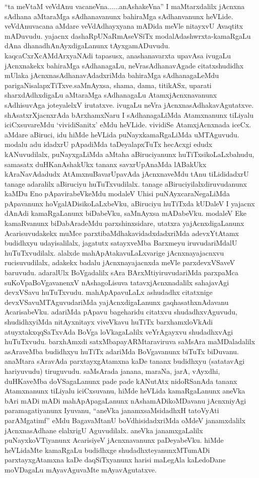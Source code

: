 \begin{artha}
``ta meVtaM veVdAnu vacaneVna......anAshakeVna'' I maMtarxdalilx jAcnxna sAdhana aMtaraMga sAdhanavanunx bahiraMga sAdhanvanunx heVLide. veVdAnuvacana aMdare veVdAdhayxyana mADida meVle nitayxvU Avaqtitx mADuvudu. yajacnx dashaRpUNaRmAseVSiTx modalAda\break shwrxta-kamaRgaLu dAna dhanadhAnAyxdigaLanunx tAyxgamADuvudu. kaqcaCxrXcAMdArxyaNAdi tapasusx, anashanavarxta upavAsa ivugaLu jAcnxnakekx bahiraMga sAdhanagaLu, neVrasAdhanavAgade citatxshudidhx mUlaka jAcnxnasAdhanavAdadxriMda bahiraMga sAdhanagaLeMdu parigaNisalapxTiTxve.\break saMnAyxsa, shama, dama, titikASx, uparati sharxdAdhxdigaLu aMtaraMga sAdhanagaLu AtamxjAcnxnavanunx sAdhisuvAga joteyalelxV irutatxve. ivugaLu neVra jAcnxnasAdhakavAgutatxve. shAsatxrXjacnxrAda bArxhamxNaru I sAdhanagaLiMda Atamxnanunx tiLiyalu iciCxsuvareMdu `vividiSanitx' eMdu heVLide. vividiSe AtamxjAcnxnada iceCx. aMdare aBiruci, idu hiMde heVLida puNayxkamaRgaLiMda uMTAguvudu. modalu adu idadxrU pApadiMda taDeyalapxTuTx hecAcxgi edudx kANuvudilalx, puNayxgaLiMda aMtaha aBiruciyanunx huTiTxsikoLaLxbahudu, samasatx duHKanAshakUkx tananx savxrUpAnaMda lABakUkx kAraNavAdadudx AtAmxnuBavarUpavAda jAcnxnaveMdu tAnu tiLididadxrU tanage adaralilx aBiruciyu huTuTxvudilalx. tanage aBiruciyilalxdiruvudanunx kaMDu Eno pApavirabeVkeMdu modaleV Uhisi puNAyxcaraNegaLiMda pApavanunx hoVgalADisikoLaLxbeVku, aBiruciyu huTiTxda kUDaleV I yajacnx dAnAdi kamaRgaLanunx biDabeVku, saMnAyxsa mADabeVku. modaleV Eke kamaRvanunx biDabAradeMdu parxshinxsidare, utatxra \ndash  yajAcnxdigaLanunx Acarisuvudakekx muMce parxtibaMdhakavidadxdadxriMda adevxYtAtamx budidhxyu udayisalilalx, jagatutx satayxveMba Barxmeyu iruvudariMdalU huTuTxvudilalx. alalxde mahApAtakavuLaLxvarige jAcnxnayajacnxvu rucisuvudilalx, adakekx badalu jAcnxnayajacnxda meVle parxdevxVSaveV baruvudu. adaralUlx BoVgadalilx sAra BArxMtiyiruvudariMda parxpaMca suKoVpaBoVgavanenxV nAshagoLisuva tatavxjAcnxnadalilx sahajavAgi devxVSavu huTuTxvudu. mahApApavuLaLx ashudadhx citatxnige devxVSavuMTAguvudariMda yajAcnxdigaLanunx gaqhasathxnAdavanu AcarisabeVku. adariMda pApavu bageharidu citatxvu shudadhxvAguvudu, shudidhxyiMda nitAyxnitayx viveVkavu huTiTx barxhamxloVkAdi atuyxtakxqqSaTxvAda BoVga loVkagaLalilx veYrAgayxvu shudadhxvAgi huTuTxvudu. barxhAmxdi satxMbapayARMtaraviruva saMsAra maMDaladalilx asAraveMba budidhxyu huTiTx adariMda BoVgavanunx biTuTx biDuvanu. anaMtara sAravAda parxtayxgAtamxna kaDe tananx budidhxyu (satatavAgi hariyuvudu) tiruguvudu. saMsArada janana, maraNa, jarA, vAyxdhi, duHKaveMba doVSagaLanunx pade pade kANutAtx nidoRSanAda tananx Atamxnanunx tiLiyalu iciCxsuvanu, hiMde heVLida kamaRgaLanunx aneVka bAri mADi mADi mahApApagaLanunx nAshamADikoMDavanu jAcnxniyAgi paramagatiyanunx Iyuvanu, ``aneVka janamxsaMsidadhxH tatoVyAti parAMgatimf'' eMdu BagavaMtanU boVdhisidadxriMda oMdeV janamxdalilx jAcnxnasAdhane elalxrigU Aguvudilalx. aneVka janamxgaLalilx puNayxkoVTiyanunx AcarisiyeV jAcnxnavanunx paDeyabeVku. hiMde heVLidaMte kamaRgaLu budidhxge shudadhxteyanunxMTumADi parxtayxgAtamxna kaDe daqSiTxyanunx harisi maLegAla kaLedoDane moVDagaLu mAyavAguvaMte mAyavAgutatxve.
\end{artha}


